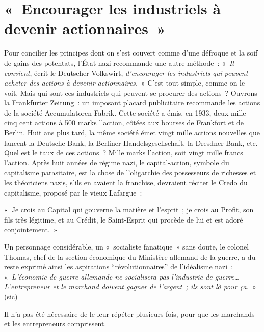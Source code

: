 \documentclass[french,twoside]{book} %
\newenvironment{quoteblock}%
  {\begin{quoting}}
  {\end{quoting}}
\newenvironment{quotebar}{%
    \def\FrameCommand{{\color{rubric!10!}\vrule width 0.5em} \hspace{0.9em}}%
    \def\OuterFrameSep{\itemsep} %
    \MakeFramed {\advance\hsize-\width \FrameRestore}
  }%
  {%
    \endMakeFramed
  }
\renewenvironment{quoteblock}%
  {%
    \savenotes
    \setstretch{0.9}
    \normalfont
    \begin{quotebar}
  }
  {%
    \end{quotebar}
    \spewnotes
  }
\begin{document}
\section[{« Encourager les industriels à devenir actionnaires »}]{« Encourager les industriels à devenir actionnaires »}
\noindent Pour concilier les principes dont on s’est couvert comme d’une défroque et la soif de gains des potentats, l’État nazi recommande une autre méthode : « \emph{Il convient}, écrit le Deutscher Volkswirt, \emph{d’encourager les industriels qui peuvent acheter des actions à devenir actionnaires.} » C’est tout simple, comme on le voit. Mais qui sont ces industriels qui peuvent se procurer des actions ? Ouvrons la Frankfurter Zeitung : un imposant placard publicitaire recommande les actions de la société Accumulatoren Fabrik. Cette société a émis, en 1933, deux mille cinq cent actions à 500 marks l’action, côtées aux bourses de Frankfort et de Berlin. Huit ans plus tard, la même société émet vingt mille actions nouvelles que lancent la Deutsche Bank, la Berliner Handelsgesellschaft, la Dresdner Bank, etc. Quel est le taux de ces actions ? Mille marks l’action, soit vingt mille francs l’action. Après huit années de régime nazi, le capital-action, symbole du capitalisme parasitaire, est la chose de l’oligarchie des possesseurs de richesses et les théoriciens nazis, s’ils en avaient la franchise, devraient réciter le Credo du capitalisme, proposé par le vieux Lafargue :\par

\begin{quoteblock}
 \noindent « Je crois au Capital qui gouverne la matière et l’esprit ; je crois au Profit, son fils très légitime, et au Crédit, le Saint-Esprit qui procède de lui et est adoré conjointement. »
 \end{quoteblock}

\noindent Un personnage considérable, un « socialiste fanatique » sans doute, le colonel Thomas, chef de la section économique du Ministère allemand de la guerre, a du reste exprimé ainsi les aspirations “révolutionnaires” de l’idéalisme nazi : « \emph{L’économie de guerre allemande ne socialisera pas l’industrie de guerre… L’entrepreneur et le marchand doivent gagner de l’argent ; ils sont là pour ça.} » (sic)\par
Il n’a pas été nécessaire de le leur répéter plusieurs fois, pour que les marchands et les entrepreneurs comprissent.
\end{document}

